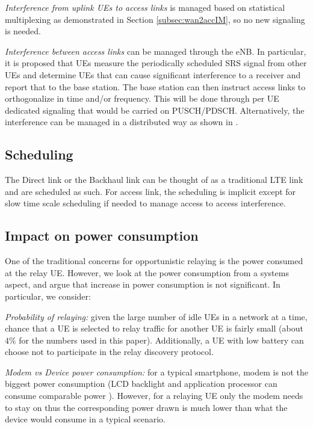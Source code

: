 \documentclass[journal]{IEEEtran}
\begin{document}
{\em Interference from uplink UEs to access links} is managed based on statistical multiplexing as demonstrated in Section \ref{subsec:wan2accIM}, so no new signaling is needed.

{\em Interference between access links} can be managed through the eNB. In particular, it is proposed that UEs measure the periodically scheduled SRS signal from other UEs and determine UEs that can cause significant interference to a receiver and report that to the base station. The base station can then instruct access links to orthogonalize in time and/or frequency. This will be done through per UE dedicated signaling that would be carried on PUSCH/PDSCH. Alternatively, the interference can be managed in a distributed way as shown in \cite{WuTavildarShakkottai10}.

\subsection{Scheduling}
The Direct link or the Backhaul link can be thought of as a traditional LTE link and are scheduled as such.  For access link, the scheduling is implicit except for slow time scale scheduling if needed to manage access to access interference.

\subsection{Impact on power consumption}

One of the traditional concerns for opportunistic relaying is the power consumed at the relay UE. However, we look at the power consumption from a systems aspect, and argue that increase in power consumption is not significant. In particular, we consider:


{\em Probability of relaying: } given the large number of idle UEs in a network at a time, chance that a UE is selected to relay traffic for another UE is fairly small (about $4\%$ for the numbers used in this paper). Additionally, a UE with low battery can choose not to participate in the relay discovery protocol.

{\em Modem vs Device power consumption:} for a typical smartphone, modem is not the biggest power consumption (LCD backlight and application processor can consume comparable power \cite{CarrollHeiser10}). However, for a relaying UE only the modem needs to stay on thus the corresponding power drawn is much lower than what the device would consume in a typical scenario.
\end{document}
